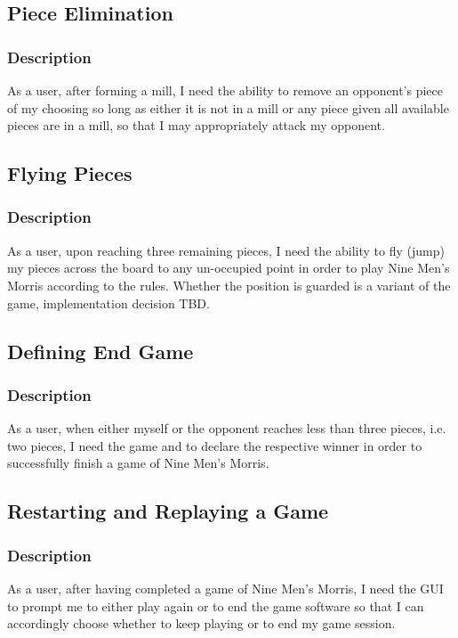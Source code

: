 \documentclass[11pt]{article}
\begin{document}
\subsection{Piece Elimination}
\label{sec:orgb0bd3e8}
\subsubsection*{Description}
\label{sec:orgb1defc2}
As a user, after forming a mill, I need the ability to remove an opponent's piece of my choosing
so long as either it is not in a mill or any piece given all available pieces are in a mill, so
that I may appropriately attack my opponent.
\subsection{Flying Pieces}
\label{sec:org270d580}
\subsubsection*{Description}
\label{sec:orgf1b80f9}
As a user, upon reaching three remaining pieces, I need the ability to fly (jump) my pieces
across the board to any un-occupied point in order to play Nine Men's Morris according to the
rules. Whether the position is guarded is a variant of the game, implementation decision TBD.
\subsection{Defining End Game}
\label{sec:org61ed46a}
\subsubsection*{Description}
\label{sec:org6557e28}
As a user, when either myself or the opponent reaches less than three pieces, i.e. two pieces, I
need the game and to declare the respective winner in order to successfully finish a game of
Nine Men's Morris.
\subsection{Restarting and Replaying a Game}
\label{sec:org9b963e0}
\subsubsection*{Description}
\label{sec:org0e9379b}
As a user, after having completed a game of Nine Men's Morris, I need the GUI to prompt me to
either play again or to end the game software so that I can accordingly choose whether to keep
playing or to end my game session.
\end{document}
